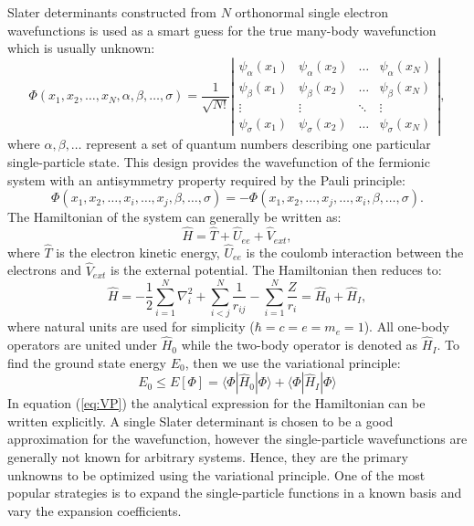 \documentclass[twoside,english]{uiofysmaster}
\begin{document}
Slater determinants constructed from $N$ orthonormal single electron wavefunctions is used as a smart guess for the true many-body wavefunction which is usually unknown:
\begin{equation}\label{eq:HartreeFockDet}
\Phi(x_1, x_2,\dots ,x_N,\alpha,\beta,\dots, \sigma)=\frac{1}{\sqrt{N!}}
\left| \begin{array}{ccccc} \psi_{\alpha}(x_1)& \psi_{\alpha}(x_2)& \dots & \psi_{\alpha}(x_N)\\
\psi_{\beta}(x_1)&\psi_{\beta}(x_2)& \dots  & \psi_{\beta}(x_N)\\  
\vdots & \vdots & \ddots  & \vdots \\
\psi_{\sigma}(x_1)&\psi_{\sigma}(x_2)& \dots  & \psi_{\sigma}(x_N)\end{array} \right|, 
\end{equation}
where $\alpha, \beta, \dots $ represent a set of quantum numbers describing one particular single-particle state. This design provides the wavefunction of the fermionic system with an antisymmetry property required by the Pauli principle:
\begin{equation}
\Phi(x_1, x_2,\dots ,x_i,\dots, x_j, \beta,\dots, \sigma) = -\Phi(x_1, x_2,\dots ,x_j,\dots, x_i, \beta,\dots, \sigma).
\end{equation}
The Hamiltonian of the system can generally be written as:
\begin{equation}\label{HAM}
\hat{H} = \hat{T} + \hat{U}_{ee} + \hat{V}_{ext},
\end{equation}
where $\hat{T}$ is the electron kinetic energy, $\hat{U}_{ee}$ is the coulomb interaction between the electrons and $\hat{V}_{ext}$ is the external potential. %
The Hamiltonian then reduces to:
\[
\hat{H} = -\frac{1}{2}\sum_{i=1}^{N} \nabla_i^2 + \sum_{i<j}^{N}\frac{1}{r_{ij}} - \sum_{i=1}^{N} \frac{Z}{r_i} = \hat{H}_0 + \hat{H}_I,
\]
where natural units are used for simplicity ($\hbar=c=e=m_e=1$). All one-body operators are united under $\hat{H}_0$ while the two-body operator is denoted as $\hat{H}_I$.
To find the ground state energy $E_0$, then we use the variational principle\cite{SzaboModernQuantumChemistry1996}:
\begin{equation}\label{eq:VP}
E_0 \le E[\Phi] = \langle \Phi|\hat{H}_0|\Phi\rangle + \langle \Phi|\hat{H}_I|\Phi\rangle
\end{equation}
In equation (\ref{eq:VP}) the analytical expression for the Hamiltonian can be written explicitly. A single Slater determinant is chosen to be a good approximation for the wavefunction, however the single-particle wavefunctions are generally not known for arbitrary systems. Hence, they are the primary unknowns to be optimized using the variational principle. One of the most popular strategies is to expand the single-particle functions in a known basis and vary the expansion coefficients.
\end{document}
